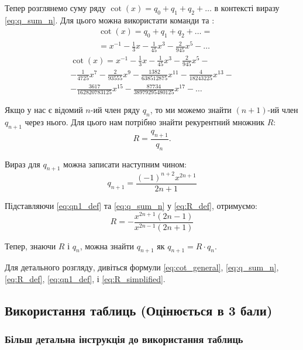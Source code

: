 \documentclass[14pt,a4paper,twoside]{article}
\begin{document}
	Тепер розглянемо суму ряду \( \cot(x)  = q_0 + q_1 + q_2 + \ldots\) в контексті виразу \eqref{eq:q_sum_n}. Для цього можна використати команди  та :
	\begin{align} \label{eq:cot_sum}
		& \cot(x) = q_0 + q_1 + q_2 + \ldots  = \\ 
		&= {x^{-1}} - \frac{1}{3}x - \frac{1}{45}x^3 - \frac{2}{945}x^5 - \ldots \nonumber
	\end{align}
	\begin{multline} \label{eq:sum_series_10_terms}
		\cot(x) ={x^{-1}} - \frac{1}{3}x - \frac{1}{45}x^3 - \frac{2}{945}x^5 -  \\
		- \frac{1}{4725}x^7 - \frac{2}{93555}x^9 - \frac{1382}{638512875}x^{11} - \frac{4}{18243225}x^{13} - \\
	    - \frac{3617}{162820783125}x^{15} - \frac{87734}{38979295480125}x^{17} - \ldots
	\end{multline}
	
	Якщо у нас є відомий \( n \)-ий член ряду \( q_n \), то ми можемо знайти \( (n+1) \)-ий член \( q_{n+1} \) через нього. Для цього нам потрібно знайти рекурентний множник \( R \): 
	\begin{equation} \label{eq:R_def}
		R = \frac{q_{n+1}}{q_n}.
	\end{equation}
	
	Вираз для \( q_{n+1} \) можна записати наступним чином:
	\begin{equation} \label{eq:qn1_def}
		q_{n+1} = \frac{(-1)^{n+2} x^{2n+1}}{2n+1}
	\end{equation}
	
	Підставляючи \eqref{eq:qn1_def} та \eqref{eq:q_sum_n} у \eqref{eq:R_def}, отримуємо:
	\begin{equation} \label{eq:R_simplified}
		R = -\frac{x^{2n+1} (2n-1)}{x^{2n-1} (2n+1)}
	\end{equation}
	
	Тепер, знаючи \( R \) і \( q_n \), можна знайти \( q_{n+1} \) як \( q_{n+1} = R \cdot q_n \).
	
	Для детального розгляду, дивіться формули \eqref{eq:cot_general}, \eqref{eq:q_sum_n}, \eqref{eq:R_def}, \eqref{eq:qn1_def}, і \eqref{eq:R_simplified}.
	
	
	\subsection{Використання таблиць (Оцінюється в 3 бали)}
	
	\subsubsection{Більш детальна інструкція до використання таблиць}
	
\end{document}

